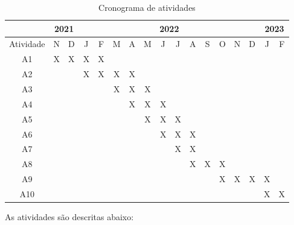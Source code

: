 \documentclass[12pt, a4paper, english, brazil]{article}
\begin{document}
\begin{table}[htb]
\centering
\caption{Cronograma de atividades}
\label{tab:cronograma}
\begin{tabular}{|c|c|c|c|c|c|c|c|c|c|c|c|c|c|c|c|c|}
\hline
          & \multicolumn{2}{c|}{2021} & \multicolumn{12}{c|}{2022}                    & \multicolumn{2}{c|}{2023} \\ \hline
Atividade & N           & D           & J & F & M & A & M & J & J & A & S & O & N & D & J           & F           \\ \hline
A1        & X           & X           & X & X &   &   &   &   &   &   &   &   &   &   &             &             \\ \hline
A2        &             &             & X & X & X & X &   &   &   &   &   &   &   &   &             &             \\ \hline
A3        &             &             &   &   & X & X & X &   &   &   &   &   &   &   &             &             \\ \hline
A4        &             &             &   &   &   & X & X & X &   &   &   &   &   &   &             &             \\ \hline
A5        &             &             &   &   &   &   & X & X & X &   &   &   &   &   &             &             \\ \hline
A6        &             &             &   &   &   &   &   & X & X & X &   &   &   &   &             &             \\ \hline
A7        &             &             &   &   &   &   &   &   & X & X &   &   &   &   &             &             \\ \hline
A8        &             &             &   &   &   &   &   &   &   & X & X & X &   &   &             &             \\ \hline
A9        &             &             &   &   &   &   &   &   &   &   &   & X & X & X & X           &             \\ \hline
A10       &             &             &   &   &   &   &   &   &   &   &   &   &   &   & X           & X           \\ \hline
\end{tabular}
\end{table}

As atividades são descritas abaixo:
\end{document}

